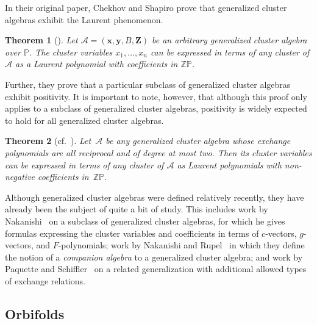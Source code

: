 \documentclass[11pt]{article}
\numberwithin{equation}{section}
\newtheorem{Theorem}{Theorem}[section]
\begin{document}
In their original paper, Chekhov and Shapiro prove that generalized cluster algebras exhibit the Laurent phenomenon.

\begin{Theorem}[{\cite[Theorem 2.5]{Chekhov-Shapiro}}]
\label{CS-LP}
Let $\mathcal{A} = (\mathbf{x}, \mathbf{y}, B, \mathbf{Z})$ be an arbitrary generalized cluster algebra over $\mathbb{P}$. The cluster variables $x_1, \dots, x_n$ can be expressed in terms of any cluster of $\mathcal{A}$ as a Laurent polynomial with coefficients in $\mathbb{ZP}$.
\end{Theorem}

Further, they prove that a particular subclass of generalized cluster algebras exhibit positivity. It is important to note, however, that although this proof only applies to a subclass of generalized cluster algebras, positivity is widely expected to hold for all generalized cluster algebras.

\begin{Theorem}[{cf.\ \cite[Section 5]{Chekhov-Shapiro}}]\label{CS-reciprocalDeg2}
Let~$\mathcal{A}$ be any generalized cluster algebra whose exchange polynomials are all reciprocal and of degree at most two. Then its cluster variables can be expressed in terms of any cluster of $\mathcal{A}$ as Laurent polynomials with non-negative coefficients in~$\mathbb{ZP}$.
\end{Theorem}

Although generalized cluster algebras were defined relatively recently, they have already been the subject of quite a bit of study. This includes work by Nakanishi~\cite{Nakanishi} on a subclass of generalized cluster algebras, for which he gives formulas expressing the cluster variables and coefficients in terms of $c$-vectors, $g$-vectors, and $F$-polynomials; work by Nakanishi and Rupel~\cite{Nakanishi-Rupel} in which they define the notion of a \emph{companion algebra} to a generalized cluster algebra; and work by Paquette and Schiffler~\cite{Paquette-Schiffler} on a related generalization with additional allowed types of exchange relations.

\subsection{Orbifolds}\label{sec:orbifolds}
\end{document}
